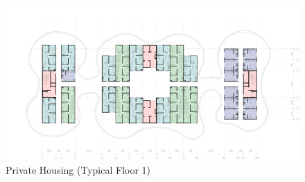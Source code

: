 \begin{figure}[H]
	\centering
	\includegraphics[width=\linewidth]{src/graphics/nurture--priv-housing-typical-floor-01.jpg}
	\caption*{%
		Private Housing (Typical Floor 1)
	}
	\label{
		fig:nurture--priv-housing-typical-floor-01
	}
\end{figure}
